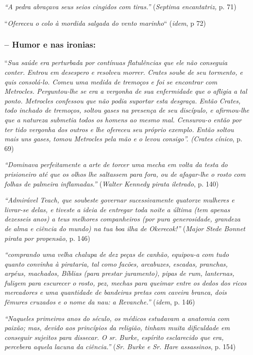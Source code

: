 \documentclass[12pt]{extarticle}
\begin{document}
\emph{``A pedra abraçava seus seios cingidos com tiras.''}
(\emph{Septima encantatriz,} p. 71)

``\emph{Ofereceu o colo à mordida salgada do vento marinho}``
(\emph{idem}, p 72)

\subsubsection{-- Humor e nas ironias:}

``\emph{Sua saúde era perturbada por contínuas flatulências que ele não
conseguia conter. Entrou em desespero e resolveu morrer. Crates soube de
seu tormento, e quis consolá-lo. Comeu uma medida de tremoços e foi se
encontrar com Metrocles. Perguntou-lhe se era a vergonha de sua
enfermidade que o afligia a tal ponto. Metrocles confessou que não podia
suportar esta desgraça. Então Crates, todo inchado de tremoços, soltou
gases na presença de seu discípulo, e afirmou-lhe que a natureza
submetia todos os homens ao mesmo mal. Censurou-o então por ter tido
vergonha dos outros e lhe ofereceu seu próprio exemplo. Então soltou
mais uns gases, tomou Metrocles pela mão e o levou consigo''. (Crates
cínico}, p. 69)

\emph{``Dominava perfeitamente a arte de torcer uma mecha em volta da
testa do prisioneiro até que os olhos lhe saltassem para fora, ou de
afagar-lhe o rosto com folhas de palmeira inflamadas.''} (\emph{Walter
Kennedy pirata iletrado}, p. 140)

\emph{``Admirável Teach, que soubeste governar sucessivamente quatorze
mulheres e livrar-se delas, e tiveste a ideia de entregar toda noite a
última (tem apenas dezesseis anos) a teus melhores companheiros (por
pura generosidade, grandeza de alma e ciência do mundo) na tua boa ilha
de Okerecok!''} (\emph{Major Stede Bonnet pirata por propensão}, p. 146)

\emph{``comprando uma velha chalupa de dez peças de canhão, equipou-a
com tudo quanto convinha à pirataria, tal como facões, arcabuzes,
escadas, pranchas, arpéus, machados, Bíblias (para prestar juramento),
pipas de rum, lanternas, fuligem para escurecer o rosto, pez, mechas
para queimar entre os dedos dos ricos mercadores e uma quantidade de
bandeiras pretas com caveira branca, dois fêmures cruzados e o nome da
nau: a Revanche.''} (\emph{idem}, p. 146)

\emph{``Naqueles primeiros anos do século, os médicos estudavam a
anatomia com paixão; mas, devido aos princípios da religião, tinham
muita dificuldade em conseguir sujeitos para dissecar. O sr. Burke,
espírito esclarecido que era, percebera aquela lacuna da ciência.''}
(\emph{Sr. Burke e Sr. Hare assassinos}, p. 154)
\end{document}
